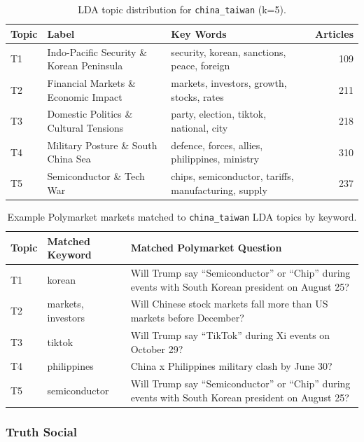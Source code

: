\documentclass[11pt,a4paper]{article}
\begin{document}
\begin{table}[H]
\centering
\begin{tabular}{llp{6cm}r}
\hline
\textbf{Topic} & \textbf{Label} & \textbf{Key Words} & \textbf{Articles} \\
\hline
T1 & Indo-Pacific Security \& Korean Peninsula & security, korean, sanctions, peace, foreign & 109 \\
T2 & Financial Markets \& Economic Impact & markets, investors, growth, stocks, rates & 211 \\
T3 & Domestic Politics \& Cultural Tensions & party, election, tiktok, national, city & 218 \\
T4 & Military Posture \& South China Sea & defence, forces, allies, philippines, ministry & 310 \\
T5 & Semiconductor \& Tech War & chips, semiconductor, tariffs, manufacturing, supply & 237 \\
\hline
\end{tabular}
\caption{LDA topic distribution for \texttt{china\_taiwan} (k=5).}
\label{tab:lda_china_taiwan}
\end{table} 

\begin{table}[H]
\centering
\begin{tabular}{p{2cm}p{4.8cm}p{9.5cm}}
\hline
\textbf{Topic} & \textbf{Matched Keyword} & \textbf{Matched Polymarket Question} \\
\hline
T1 & korean & Will Trump say ``Semiconductor'' or ``Chip'' during events with South Korean president on August 25? \\
T2 & markets, investors & Will Chinese stock markets fall more than US markets before December? \\ %
T3 & tiktok & Will Trump say ``TikTok'' during Xi events on October 29? \\
T4 & philippines & China x Philippines military clash by June 30? \\
T5 & semiconductor & Will Trump say ``Semiconductor'' or ``Chip'' during events with South Korean president on August 25? \\
\hline
\end{tabular}
\caption{Example Polymarket markets matched to \texttt{china\_taiwan} LDA topics by keyword.}
\label{tab:polymarket_china_taiwan}
\end{table}

\subsubsection*{Truth Social}
\end{document}
